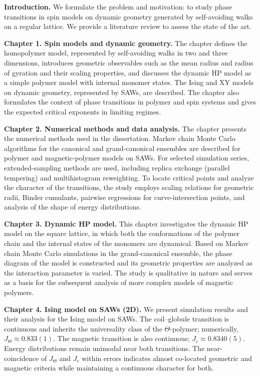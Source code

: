 \noindent\textbf{Introduction.}
We formulate the problem and motivation: to study phase transitions in spin models on dynamic geometry generated by self-avoiding walks on a regular lattice. We provide a literature review to assess the state of the art.

\medskip
\noindent\textbf{Chapter 1. Spin models and dynamic geometry.}
The chapter defines the homopolymer model, represented by self-avoiding walks in two and three dimensions, introduces geometric observables such as the mean radius and radius of gyration and their scaling properties, and discusses the dynamic HP model as a simple polymer model with internal monomer states. The Ising and XY models on dynamic geometry, represented by SAWs, are described. The chapter also formulates the context of phase transitions in polymer and spin systems and gives the expected critical exponents in limiting regimes.

\medskip
\noindent\textbf{Chapter 2. Numerical methods and data analysis.}
The chapter presents the numerical methods used in the dissertation. Markov chain Monte Carlo algorithms for the canonical and grand-canonical ensembles are described for polymer and magnetic-polymer models on SAWs. For selected simulation series, extended-sampling methods are used, including replica exchange (parallel tempering) and multihistogram reweighting. To locate critical points and analyze the character of the transitions, the study employs scaling relations for geometric radii, Binder cumulants, pairwise regressions for curve-intersection points, and analysis of the shape of energy distributions.

\medskip
\noindent\textbf{Chapter 3. Dynamic HP model.}
This chapter investigates the dynamic HP model on the square lattice, in which both the conformations of the polymer chain and the internal states of the monomers are dynamical. Based on Markov chain Monte Carlo simulations in the grand-canonical ensemble, the phase diagram of the model is constructed and its geometric properties are analyzed as the interaction parameter is varied. The study is qualitative in nature and serves as a basis for the subsequent analysis of more complex models of magnetic polymers.

\medskip
\noindent\textbf{Chapter 4. Ising model on SAWs (2D).}
We present simulation results and their analysis for the Ising model on SAWs. The coil--globule transition is continuous and inherits the universality class of the $\Theta$-polymer; numerically, $J_{\Theta}\approx 0.833(1)$. The magnetic transition is also continuous; $J_{c}\approx 0.8340(5)$. Energy distributions remain unimodal near both transitions. The near-coincidence of $J_{\Theta}$ and $J_{c}$ within errors indicates almost co-located geometric and magnetic criteria while maintaining a continuous character for both.

